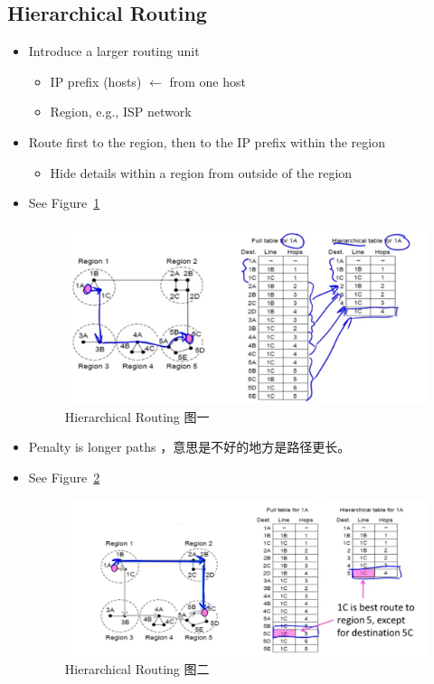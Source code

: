 \documentclass[12pt]{ctexart}   %
\begin{document}
	\subsection{Hierarchical Routing}
	\begin{itemize}
		\item Introduce a larger routing unit
		\begin{itemize}
			\item IP prefix (hosts) $\leftarrow$ from one host
			\item Region, e.g., ISP network
		\end{itemize}
		
		\item Route first to the region, then to the IP prefix within the region
		\begin{itemize}
			\item Hide details within a region from outside of the region
		\end{itemize}
		\item See Figure~\ref{fig:5-9-1}
			
		\begin{figure}[h!] %
		\centering
		 \includegraphics[scale=0.7]{images/5-9-1}
		\caption{ Hierarchical Routing  图一}
		 \label{fig:5-9-1}
		 \end{figure}
		 
		 \item Penalty is longer paths ，意思是不好的地方是路径更长。
		 \item See Figure~\ref{fig:5-9-2}
			
		\begin{figure}[h!] %
		\centering
		 \includegraphics[scale=0.7]{images/5-9-2}
		\caption{ Hierarchical Routing 图二}
		 \label{fig:5-9-2}
		 \end{figure}
		 
	\end{itemize}
	
\end{document}
